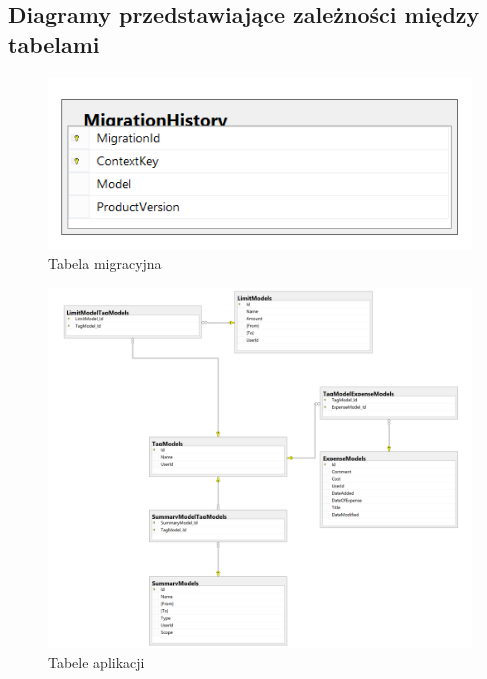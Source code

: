 \documentclass[10pt,titlepage]{article}
\begin{document}
\subsection{Diagramy przedstawiające zależności między tabelami}
\begin{figure}[H]
  \centering
  \includegraphics[scale=0.5]{images/db2.png}
  \caption{Tabela migracyjna}
\end{figure}
\begin{figure}[H]
  \centering
  \includegraphics[scale=0.3]{images/db1.png}
  \caption{Tabele aplikacji}
\end{figure}
\end{document}
